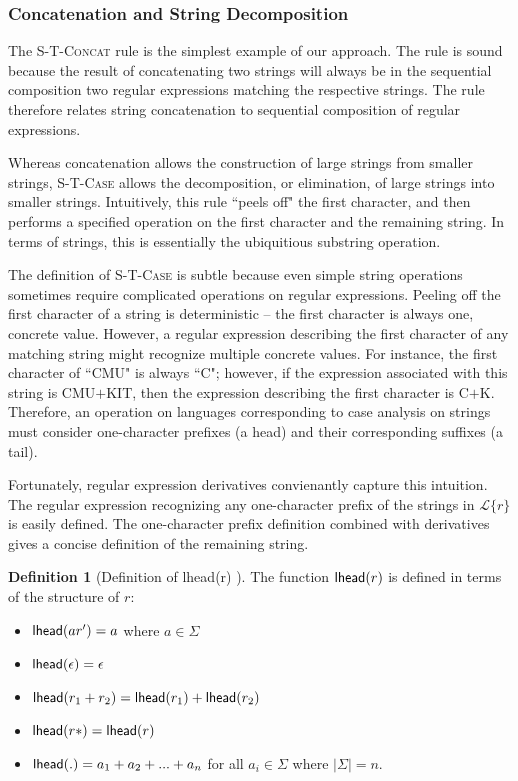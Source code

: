 \documentclass[9pt]{sig-alternate}
\theoremstyle{definition}
\newtheorem{defn}[thm]{Definition}
\newcommand{\Lagr}{\mathcal{L}}
\newcommand{\lang}[1]{\Lagr\{#1\}}
\newcommand{\lhead}[1]{ {\sf lhead}(#1) }
\begin{document}
\subsubsection{Concatenation and String Decomposition}

The \textsc{S-T-Concat} rule is the simplest example of our approach. The rule is sound because the result of concatenating two strings will always be in the sequential composition two regular expressions matching the respective strings. The rule therefore relates string concatenation to sequential composition of regular expressions.

Whereas concatenation allows the construction of large strings from smaller strings, \textsc{S-T-Case} allows the decomposition, or elimination, of large strings into smaller strings. Intuitively, this rule ``peels off" the first character, and then performs a specified operation on the first character and the remaining string. In terms of strings, this is essentially the ubiquitious substring operation.

The definition of \textsc{S-T-Case} is subtle because even simple string operations sometimes require complicated operations on regular expressions. Peeling off the first character of a string is deterministic -- the first character is always one, concrete value. However, a regular expression describing the first character of any matching string might recognize multiple concrete values. For instance, the first character of ``CMU" is always ``C"; however, if the expression associated with this string is CMU$+$KIT, then the expression describing the first character is C$+$K.
Therefore, an operation on languages corresponding to case analysis on strings must consider one-character prefixes (a head) and their corresponding suffixes (a tail).

Fortunately, regular expression derivatives \cite{bowzer} convienantly capture this intuition.
The regular expression recognizing any one-character prefix of the strings in $\lang{r}$ is easily defined.
The one-character prefix definition combined with derivatives gives a concise definition of the
remaining string.

\begin{defn}[Definition of \lhead{r}]
The function $\lhead{r}$ is defined in terms of the structure of $r$:
\begin{itemize}
\item $\lhead{a r'} = a$ where $a \in \Sigma$
\item $\lhead{\epsilon} = \epsilon$
\item $\lhead{r_1 +  r_2}  = \lhead{r_1} + \lhead{r_2}$
\item $\lhead{r*} = \lhead{r}$
\item $\lhead{.} = a_1 + a_2 + ... + a_n$ for all $a_i \in \Sigma$ where $|\Sigma| = n$.
\end{itemize}
\end{defn}
\end{document}
